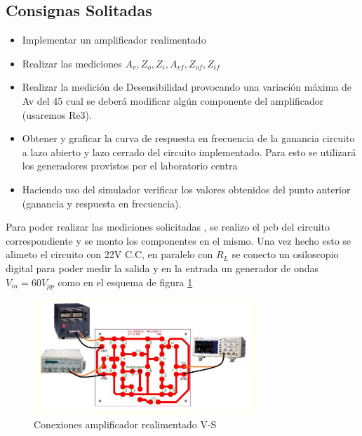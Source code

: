 \documentclass[12pt, letterpaper]{article}
\begin{document}
\subsection{Consignas Solitadas}
\begin{itemize}
	\item  Implementar un amplificador realimentado
    \item  Realizar las mediciones $A_v, Z_o,Z_i, A_{vf},Z_{of},Z_{if} $
    \item  Realizar la medición de Desensibilidad provocando una variación máxima de Av del 45%
	cual se deberá modificar algún componente del amplificador (usaremos Re3).
    \item Obtener y graficar la curva de respuesta en frecuencia de la ganancia circuito a lazo abierto y lazo
	cerrado del circuito implementado. Para esto se utilizará los generadores provistos por el
	laboratorio centra
    \item Haciendo uso del simulador verificar los valores obtenidos del punto anterior (ganancia y
	respuesta en frecuencia).
\end{itemize}
Para poder realizar las mediciones solicitadas , se realizo el pcb del circuito correspondiente y se monto los componentes en el mismo.
Una vez hecho esto se alimeto el circuito con 22V C.C, en paralelo con $R_L$ se conecto un osiloscopio digital para poder medir la salida y en la entrada un generador de ondas $V_{in}= 60 V_{pp}$ como en el esquema de figura \ref{fig:4.1}
\begin{figure}[h]
	\centering
	\includegraphics[width=0.75\textwidth]{Imagenes/conexion.png}
	\caption{Conexiones amplificador realimentado V-S}
	\label{fig:4.1}
\end{figure}
\end{document}
